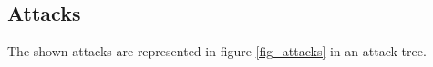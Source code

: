 \subsection{Attacks}



The shown attacks are represented in figure \ref{fig_attacks} in an attack tree.
